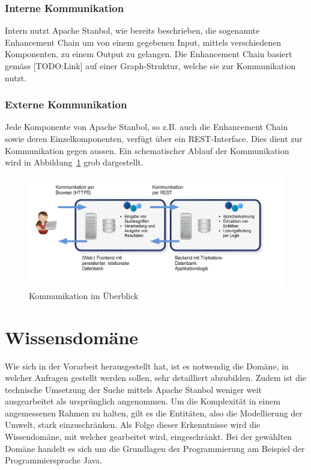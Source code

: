 \subsection{Interne Kommunikation}
\label{sec:architektur_schnittstellen_intern}
Intern nutzt Apache Stanbol, wie bereits beschrieben, die sogenannte Enhancement Chain um von einem gegebenen Input, mittels verschiedenen Komponenten, zu einem Output zu gelangen. Die Enhancement Chain basiert gemäss [TODO:Link] auf einer Graph-Struktur, welche sie zur Kommunikation nutzt.

\subsection{Externe Kommunikation}
\label{sec:architektur_schnittstellen_extern}
Jede Komponente von Apache Stanbol, so z.B. auch die Enhancement Chain sowie deren Einzelkomponenten, verfügt über ein REST-Interface. Dies dient zur Kommunikation gegen aussen. Ein schematischer Ablauf der Kommunikation wird in Abbildung~\ref{fig:kommunikationKomponenten} grob dargestellt.

\begin{figure}[H]
	\centering
	\includegraphics[scale=0.4]{bilder/software_komponenten.png}
	\caption{Kommunikation im Überblick}
\label{fig:kommunikationKomponenten}
\end{figure}

\chapter{Wissensdomäne}
\label{chap:wissensdomäne}
Wie sich in der Vorarbeit herausgestellt hat, ist es notwendig die Domäne, in welcher Anfragen gestellt werden sollen, sehr detailliert abzubilden. Zudem ist die technische Umsetzung der Suche mittels Apache Stanbol weniger weit ausgearbeitet als ursprünglich angenommen. Um die Komplexität in einem angemessenen Rahmen zu halten, gilt es die Entitäten, also die Modellierung der Umwelt, stark einzuschränken. 
Als Folge dieser Erkenntnisse wird die Wissendomäne, mit welcher gearbeitet wird, eingeschränkt. Bei der gewählten Domäne handelt es sich um die Grundlagen der Programmierung am Beispiel der Programmiersprache Java.


